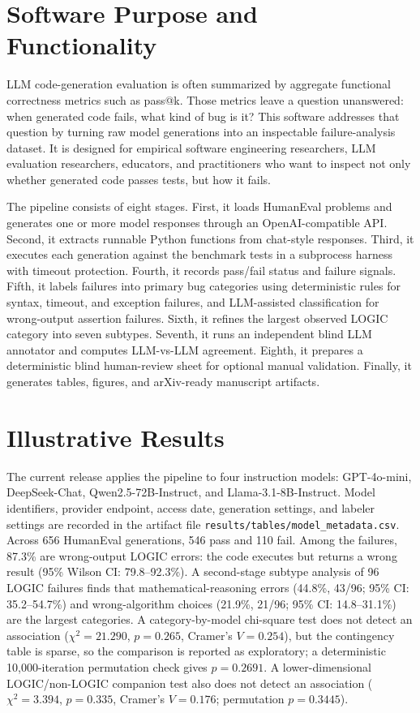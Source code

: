 \documentclass[11pt, letterpaper]{article}
\begin{document}
\section*{Software Purpose and Functionality}
LLM code-generation evaluation is often summarized by aggregate functional
correctness metrics such as pass@k. Those metrics leave a
question unanswered: when generated code fails, what kind of bug is it?
This software addresses that question by turning raw model generations into an
inspectable failure-analysis dataset. It is designed for empirical software
engineering researchers, LLM evaluation researchers, educators, and practitioners
who want to inspect not only whether generated code passes tests, but how it fails.

The pipeline consists of eight stages. First, it loads HumanEval problems and
generates one or more model responses through an OpenAI-compatible API. Second, it
extracts runnable Python functions from chat-style responses. Third, it executes
each generation against the benchmark tests in a subprocess harness with timeout
protection. Fourth, it records pass/fail status and failure signals. Fifth, it
labels failures into primary bug categories using deterministic rules for syntax,
timeout, and exception failures, and LLM-assisted classification for wrong-output
assertion failures. Sixth, it refines the largest observed LOGIC category into seven
subtypes. Seventh, it runs an independent blind LLM annotator and computes
LLM-vs-LLM agreement. Eighth, it prepares a deterministic blind human-review sheet
for optional manual validation. Finally, it generates tables, figures, and
arXiv-ready manuscript artifacts.

\section*{Illustrative Results}
The current release applies the pipeline to four instruction
models: GPT-4o-mini, DeepSeek-Chat, Qwen2.5-72B-Instruct, and
Llama-3.1-8B-Instruct. Model identifiers, provider endpoint, access date,
generation settings, and labeler settings are recorded in the artifact file
\texttt{results/tables/model\_metadata.csv}. Across 656 HumanEval generations, 546 pass and 110 fail.
Among the failures, 87.3\% are wrong-output LOGIC errors: the code executes but returns a
wrong result (95\% Wilson CI: 79.8--92.3\%). A second-stage subtype analysis of 96
LOGIC failures finds that mathematical-reasoning errors (44.8\%, 43/96; 95\% CI:
35.2--54.7\%) and wrong-algorithm choices (21.9\%, 21/96; 95\% CI: 14.8--31.1\%)
are the largest categories. A category-by-model chi-square test does not detect an
association ($\chi^2=21.290$, $p=0.265$, Cramer's $V=0.254$), but the contingency table is
sparse, so the comparison is reported as exploratory; a deterministic 10{,}000-iteration
permutation check gives $p=0.2691$. A lower-dimensional
LOGIC/non-LOGIC companion test also does not detect an association ($\chi^2=3.394$,
$p=0.335$, Cramer's $V=0.176$; permutation $p=0.3445$).
\end{document}

